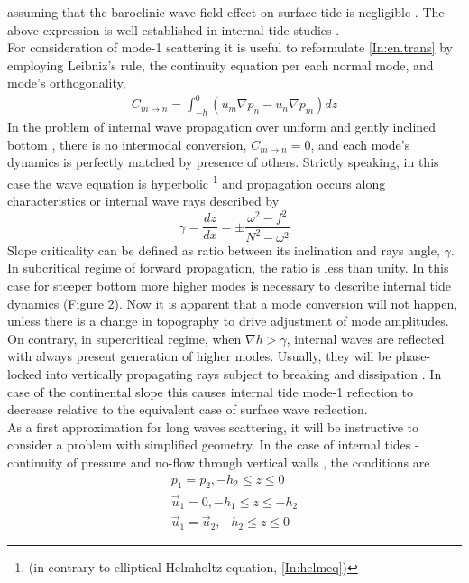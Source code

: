 \documentclass[12pt]{article}
\begin{document}
assuming that the baroclinic wave field effect on surface tide is negligible 
\citep{kelly2012cascade}. The above expression is well established in internal tide studies 
\citep{kurapov2003m, llewellyn2002conversion, pickering2015structure}.\\
For consideration of mode-1 scattering it is useful to reformulate \eqref{In:en.trans} by employing 
Leibniz's rule, the continuity equation per each normal mode, and mode's orthogonality,
\begin{align}
C_{m \to n} = \int_{-h}^{0} (u_m \nabla p_n - u_n \nabla p_m) dz
\end{align}
In the problem of internal wave propagation over uniform and gently inclined bottom 
\citep{wunsch1968propagation}, there is no intermodal conversion, $C_{m \to n} = 0$, and each 
mode's dynamics is perfectly matched by presence of others. Strictly speaking, in this case the 
wave equation is hyperbolic \footnote{(in contrary to elliptical Helmholtz equation, 
\eqref{In:helmeq})} and propagation occurs along characteristics \citep{sandstrom1969effect} or 
internal wave rays described by
\begin{equation}
\label{In:ch.angle}
\gamma = \frac{dz}{dx} = \pm \frac{\omega^2 - f^2}{N^2 - \omega^2}
\end{equation}
Slope criticality can be defined as ratio between its inclination and rays angle, $\gamma$. In 
subcritical regime of forward propagation, the ratio is less than unity. In this case for steeper 
bottom more higher modes is necessary to describe internal tide dynamics (Figure 2). Now it is 
apparent that a mode conversion will not happen, unless there is a change in topography to drive 
adjustment of mode amplitudes. On contrary, in supercritical regime, when $\nabla h > \gamma$, 
internal waves are reflected with always present generation of higher modes. Usually, they will be 
phase-locked into vertically propagating rays \citep{garrett2007internal, 
lamb2014internal} subject to breaking and dissipation \citep{lien2001observations, 
nash2004internal, klymak2011breaking}. In case of the continental slope this causes internal tide 
mode-1 reflection to decrease relative to the equivalent case of surface wave reflection.\\
As a first approximation for long waves scattering, it will be instructive to consider a problem 
with simplified geometry. In the case of internal tides - continuity of pressure and no-flow 
through vertical walls 
\citep{st2002role, larsen1969internal, chapman1981scattering}, the conditions are
\begin{align}
p_1 = p_2, -h_2 \leq z \leq 0 \\
\vec{u}_1 = 0, -h_1 \leq z \leq -h_2\\
\vec{u}_1 = \vec{u}_2, -h_2 \leq z \leq 0
\end{align}
\end{document}
